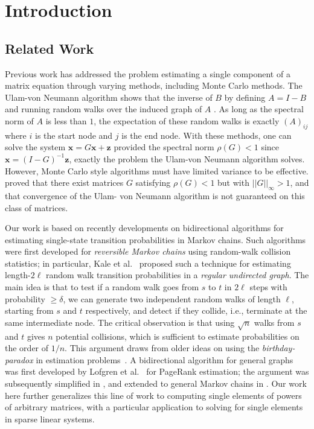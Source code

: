 \section{Introduction}


\subsection{Related Work}

Previous work has addressed the problem estimating a single component of a matrix equation through varying methods, including Monte Carlo methods. The Ulam-von Neumann algorithm shows that the inverse of $B$ by defining $A = I - B$ and running random walks over the induced graph of $A$ \cite{forsythe1950matrix}. As long as the spectral norm of $A$ is less than $1$, the expectation of these random walks is exactly $(A)_{ij}$ where $i$ is the start node and $j$ is the end node. With these methods, one can solve the system $\mathbf{x} = G\mathbf{x} + \mathbf{z}$ provided the spectral norm $\rho(G) < 1$ since $\mathbf{x} = (I-G)^{-1}\mathbf{z}$, exactly the problem the Ulam-von Neumann algorithm solves. However, Monte Carlo style algorithms must have limited variance to be effective.  \cite{ji2013convergence} proved that there exist matrices $G$ satisfying $\rho(G) < 1$ but with $||G||_\infty > 1$, and that convergence of the Ulam- von Neumann algorithm is not guaranteed on this class of matrices.

Our work is based on recently developments on bidirectional algorithms for estimating single-state transition probabilities in Markov chains.
Such algorithms were first developed for \emph{reversible Markov chains} using random-walk collision statistics; in particular, Kale et al.~\cite{Kale2008} proposed such a technique for estimating length-$2\ell$ random walk transition probabilities in a \emph{regular undirected graph}.
The main idea is that to test if a random walk goes from $s$ to $t$ in $2\ell$ steps with probability $\geq\delta$, we can generate two independent random walks of length $\ell$, starting from $s$ and $t$ respectively, and detect if they collide, i.e., terminate at the same intermediate node. 
The critical observation is that using $\sqrt{n}$ walks from $s$ and $t$ gives $n$ potential collisions, which is sufficient to estimate probabilities on the order of $1/n$.
This argument draws from older ideas on using the \emph{birthday-paradox} in estimation problems~\cite{Motwani2007}.
A bidirectional algorithm for general graphs was first developed by Lofgren et al.~\cite{Lofgren2014} for PageRank estimation; the argument was subsequently simplified in \cite{lofgren2016personalized}, and extended to general Markov chains in \cite{banerjee2015fast}. 
Our work here further generalizes this line of work to computing single elements of powers of arbitrary matrices, with a particular application to solving for single elements in sparse linear systems.


